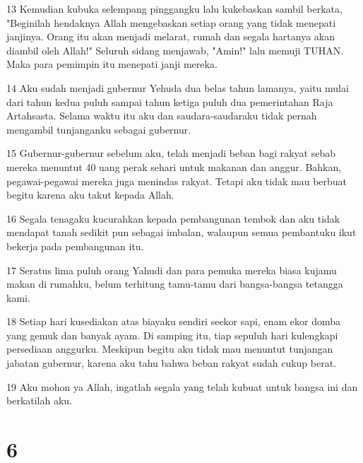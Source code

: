 \par 13 Kemudian kubuka selempang pinggangku lalu kukebaskan sambil berkata, "Beginilah hendaknya Allah mengebaskan setiap orang yang tidak menepati janjinya. Orang itu akan menjadi melarat, rumah dan segala hartanya akan diambil oleh Allah!" Seluruh sidang menjawab, "Amin!" lalu memuji TUHAN. Maka para pemimpin itu menepati janji mereka.
\par 14 Aku sudah menjadi gubernur Yehuda dua belas tahun lamanya, yaitu mulai dari tahun kedua puluh sampai tahun ketiga puluh dua pemerintahan Raja Artahsasta. Selama waktu itu aku dan saudara-saudaraku tidak pernah mengambil tunjanganku sebagai gubernur.
\par 15 Gubernur-gubernur sebelum aku, telah menjadi beban bagi rakyat sebab mereka menuntut 40 uang perak sehari untuk makanan dan anggur. Bahkan, pegawai-pegawai mereka juga menindas rakyat. Tetapi aku tidak mau berbuat begitu karena aku takut kepada Allah.
\par 16 Segala tenagaku kucurahkan kepada pembangunan tembok dan aku tidak mendapat tanah sedikit pun sebagai imbalan, walaupun semua pembantuku ikut bekerja pada pembangunan itu.
\par 17 Seratus lima puluh orang Yahudi dan para pemuka mereka biasa kujamu makan di rumahku, belum terhitung tamu-tamu dari bangsa-bangsa tetangga kami.
\par 18 Setiap hari kusediakan atas biayaku sendiri seekor sapi, enam ekor domba yang gemuk dan banyak ayam. Di samping itu, tiap sepuluh hari kulengkapi persediaan anggurku. Meskipun begitu aku tidak mau menuntut tunjangan jabatan gubernur, karena aku tahu bahwa beban rakyat sudah cukup berat.
\par 19 Aku mohon ya Allah, ingatlah segala yang telah kubuat untuk bangsa ini dan berkatilah aku.

\chapter{6}

